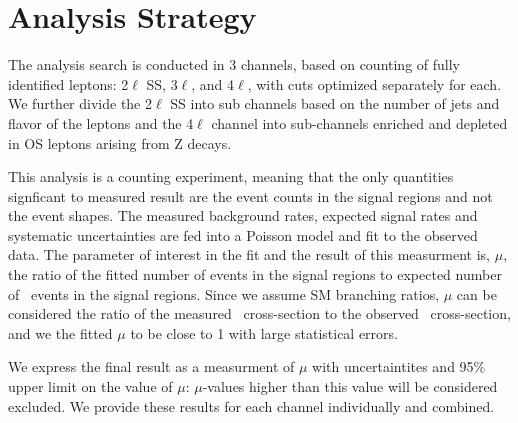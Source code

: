 \section{Analysis Strategy} 


The analysis search is conducted in 3 channels, based on counting of fully identified
leptons: 2$\ell$ SS, 3$\ell$, and 4$\ell$, with cuts optimized separately for each. We further divide the 2$\ell$ SS into sub channels
based on the number of jets and flavor of the leptons and the 4$\ell$ channel into sub-channels enriched and depleted in OS leptons arising from Z decays. 

This analysis is a counting experiment, meaning that the only quantities signficant to measured result are the event counts in the signal
regions and not the event shapes. The measured background rates, expected signal rates and systematic uncertainties are fed into a Poisson 
model and fit to the observed data. The parameter of interest in the fit and the result of this measurment is, $\mu$, the ratio of the fitted
number of \tth events in the signal regions to expected number of \tth\ events in the signal regions. Since we assume SM branching ratios,
$\mu$ can be considered the ratio of the measured \tth\ cross-section to the observed \tth\ cross-section, and we the fitted $\mu$ to be
close to 1 with large statistical errors.

We express the final result as a measurment of $\mu$ with uncertaintites and 95\% upper limit on the value of $\mu$: $\mu$-values higher than this
value will be considered excluded. We provide these results for each channel individually and combined.  




